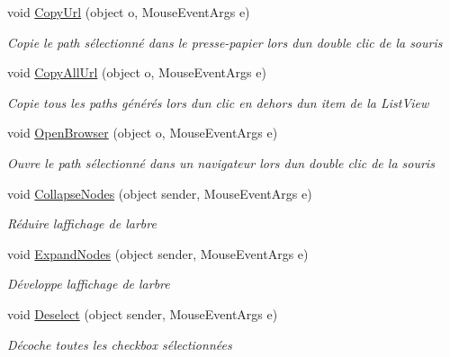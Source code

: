 \begin{DoxyCompactItemize}
void \mbox{\hyperlink{class_m_t_connect_agent_1_1_user_control_display_tab_a105e38f9a87a83a4bc4c1af82bf45993}{Copy\+Url}} (object o, Mouse\+Event\+Args e)
\begin{DoxyCompactList}\small\item\em Copie le path sélectionné dans le presse-\/papier lors d\textquotesingle{}un double clic de la souris \end{DoxyCompactList}\item 
void \mbox{\hyperlink{class_m_t_connect_agent_1_1_user_control_display_tab_ac473c5026d9d7af94210c53170be841b}{Copy\+All\+Url}} (object o, Mouse\+Event\+Args e)
\begin{DoxyCompactList}\small\item\em Copie tous les paths générés lors d\textquotesingle{}un clic en dehors d\textquotesingle{}un item de la List\+View \end{DoxyCompactList}\item 
void \mbox{\hyperlink{class_m_t_connect_agent_1_1_user_control_display_tab_a35c3095a47ee602da98eca8e77e6ff3b}{Open\+Browser}} (object o, Mouse\+Event\+Args e)
\begin{DoxyCompactList}\small\item\em Ouvre le path sélectionné dans un navigateur lors d\textquotesingle{}un double clic de la souris \end{DoxyCompactList}\item 
void \mbox{\hyperlink{class_m_t_connect_agent_1_1_user_control_display_tab_a9e5f7105041510bae0e1da721a7bc4c3}{Collapse\+Nodes}} (object sender, Mouse\+Event\+Args e)
\begin{DoxyCompactList}\small\item\em Réduire l\textquotesingle{}affichage de l\textquotesingle{}arbre \end{DoxyCompactList}\item 
void \mbox{\hyperlink{class_m_t_connect_agent_1_1_user_control_display_tab_a3b3bc198b2518ec65b3b2dba371d6f83}{Expand\+Nodes}} (object sender, Mouse\+Event\+Args e)
\begin{DoxyCompactList}\small\item\em Développe l\textquotesingle{}affichage de l\textquotesingle{}arbre \end{DoxyCompactList}\item 
void \mbox{\hyperlink{class_m_t_connect_agent_1_1_user_control_display_tab_a1913b7cb8611c0670e08abaf6e20352d}{Deselect}} (object sender, Mouse\+Event\+Args e)
\begin{DoxyCompactList}\small\item\em Décoche toutes les checkbox sélectionnées \end{DoxyCompactList}\item 

\end{DoxyCompactItemize}
